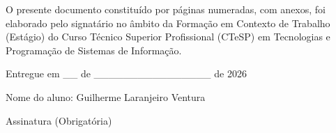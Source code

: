 
\justifying    

O presente documento constituído por \pageref{LastPage} páginas numeradas, com anexos, foi elaborado pelo signatário no âmbito da Formação em Contexto de Trabalho (Estágio) do Curso Técnico Superior Profissional (CTeSP) em Tecnologias e Programação de Sistemas de Informação.\\

\begin{center}

Entregue em \_\_ de \_\_\_\_\_\_\_\_\_\_\_\_\_\_\_\_ de 2026

\vspace{1.5cm}

Nome do aluno: Guilherme Laranjeiro Ventura

\vspace{1.5cm}

Assinatura (Obrigatória)

\end{center}

